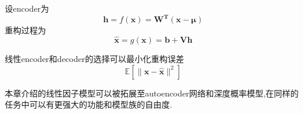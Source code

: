 设encoder为
\begin{equation}
\mathbf h=f(\mathbf x)=\mathbf{W^T(x-\mu)}
\end{equation}
重构过程为
\begin{equation}
\hat{\mathbf x}=g(\mathbf x)=\mathbf{b+Vh}
\end{equation}

线性encoder和decoder的选择可以最小化重构误差
\begin{equation}
\mathbb E[\|\mathbf{x-\hat x}\|^2]
\end{equation}

本章介绍的线性因子模型可以被拓展至autoencoder网络和深度概率模型,在同样的任务中可以有更强大的功能和模型族的自由度.